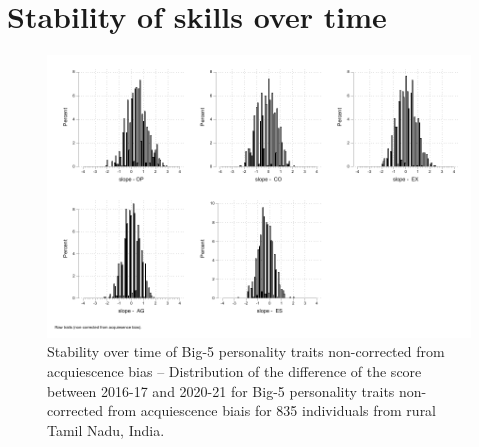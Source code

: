 \documentclass[a4paper, 12pt, onecolumn]{article}
\begin{document}
\section{Stability of skills over time}
\label{section:stab_big5}



\begin{figure}[!htb]
\raggedright
\includegraphics[scale=0.86]{INPUT/diffcont_raw}
\caption{Stability over time of Big-5 personality traits non-corrected from acquiescence bias -- Distribution of the difference of the score between 2016-17 and 2020-21 for Big-5 personality traits non-corrected from acquiescence biais for 835 individuals from rural Tamil Nadu, India.}
\label{fig:stabraw}
\end{figure}
\end{document}
